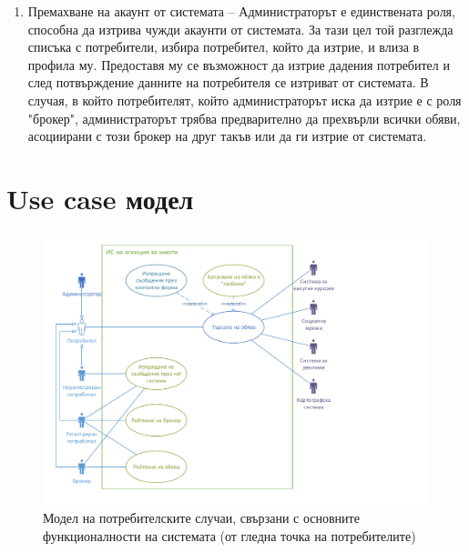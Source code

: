 \documentclass[a4paper]{article}
\begin{document}
\begin{enumerate}
\item {Премахване на акаунт от системата --
        Администраторът е единствената роля, способна да изтрива чужди акаунти от 
        системата. За тази цел той разглежда списъка с потребители, избира потребител,
        който да изтрие, и влиза в профила му. Предоставя му се възможност да изтрие
        дадения потребител и след потвърждение данните на потребителя се изтриват от
        системата. В случая, в който потребителят, който администраторът иска да изтрие
        е с роля "брокер", администраторът трябва предварително да прехвърли всички
        обяви, асоциирани с този брокер на друг такъв или да ги изтрие от системата. 
}

\end{enumerate}

\section{Use case модел} \label{ucm}

        \begin{figure}[h]
        \centering
        \includegraphics[scale=1]{uc2a}
        \caption{Модел на потребителските случаи, свързани с основните функционалности на системата (от гледна точка на потребителите)}
        \end{figure}

\clearpage
\end{document}
